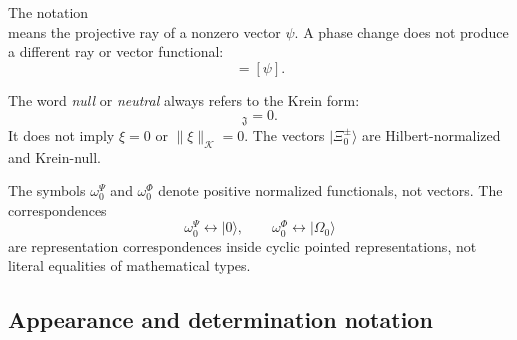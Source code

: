 \documentclass[11pt,reqno]{scrartcl}
\newcommand{\scrK}{\mathscr K}
\newcommand{\omegaP}{\omega_{0}^{\Psi}}
\newcommand{\omegaF}{\omega_{0}^{\Phi}}
\newcommand{\fundJ}{\mathfrak J}
\newcommand{\ket}[1]{\lvert #1\rangle}
\newcommand{\kInner}[2]{[#1,#2]_{\fundJ}}
\theoremstyle{plain}
\theoremstyle{definition}
\theoremstyle{remark}
\begin{document}
The notation
\begin{equation}
  [\psi]
\end{equation}
means the projective ray of a nonzero vector $\psi$.  A phase change does not
produce a different ray or vector functional:
\begin{equation}
  [e^{i\theta}\psi]=[\psi].
\end{equation}

The word \emph{null} or \emph{neutral} always refers to the Krein form:
\begin{equation}
  \kInner{\xi}{\xi}=0.
\end{equation}
It does not imply $\xi=0$ or $\|\xi\|_{\scrK}=0$.  The vectors
$\ket{\Xi_0^\pm}$ are Hilbert-normalized and Krein-null.

The symbols $\omegaP$ and $\omegaF$ denote positive normalized functionals,
not vectors.  The correspondences
\begin{equation}
  \omegaP\leftrightarrow\ket0,
  \qquad
  \omegaF\leftrightarrow\ket{\Omega_0}
\end{equation}
are representation correspondences inside cyclic pointed representations,
not literal equalities of mathematical types.

\subsection{Appearance and determination notation}
\end{document}
